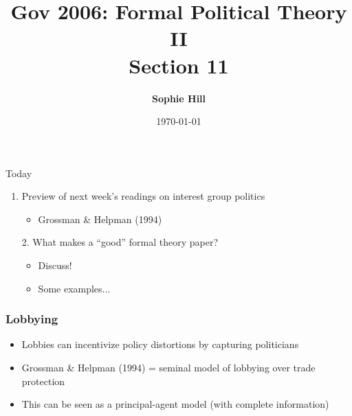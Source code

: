 \documentclass[11pt,aspectratio=169]{beamer}
\title{Gov 2006: Formal Political Theory II \\
Section 11}
\date{\today}
\author{ \textbf{Sophie Hill}}
\begin{document}
  \maketitle
  
\begin{frame}{Today}

\Large

\begin{enumerate}

\item Preview of next week's readings on interest group politics
\pause

\begin{itemize}
\setlength{\itemsep}{1em}
\item Grossman \& Helpman (1994)
\end{itemize}
\end{enumerate}


\pause

\begin{enumerate}
\item[2.] What makes a ``good'' formal theory paper?
\begin{itemize}
\item Discuss!
\item Some examples...
\end{itemize}


\end{enumerate}


\end{frame}


\begin{frame}
\frametitle{Lobbying}

\begin{itemize}
\setlength{\itemsep}{1em}
\item Lobbies can incentivize policy distortions by capturing politicians
\item Grossman \& Helpman (1994) = seminal model of lobbying over trade protection
\item This can be seen as a principal-agent model (with complete information)
\end{itemize}


\end{frame}
\end{document}
